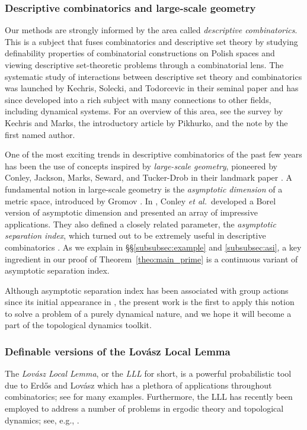 \documentclass[11pt,reqno,psamsfonts]{amsart}
\theoremstyle{bfnote}
\theoremstyle{definition}
\theoremstyle{remark}
\newcommand{\0}{\varnothing}
\numberwithin{equation}{section}
\begin{document}
    \subsubsection*{Descriptive combinatorics and large-scale geometry} Our methods are strongly informed by the area called \emph{descriptive combinatorics}. This is a subject that fuses combinatorics and descriptive set theory by studying definability properties of combinatorial constructions on Polish spaces and viewing descriptive set-theoretic problems through a combinatorial lens. The systematic study of interactions between descriptive set theory and combinatorics was launched by Kechris, Solecki, and Todorcevic in their seminal paper \cite{KST} and has since developed into a rich subject with many connections to other fields, including dynamical systems. For an overview of this area, see the survey \cite{KechrisMarks} by Kechris and Marks, the introductory article \cite{Pikh_survey} by Pikhurko, and %
    the note \cite{Notices} by the first named author. %

    One of the most exciting trends in descriptive combinatorics of the past few years has been the use of concepts inspired by \emph{large-scale geometry}, pioneered by Conley, Jackson, Marks, Seward, and Tucker-Drob in their landmark paper \cite{CJMSTD}. A fundamental notion in large-scale geometry is the \emph{asymptotic dimension} of a metric space, introduced by Gromov \cite[\S1.E]{gromov1993asymptotic}. In \cite{CJMSTD}, Conley \emph{et al.}~developed a {Borel} version of asymptotic dimension and presented an array of impressive applications. They also defined a closely related parameter, the \emph{asymptotic separation index}, which turned out to be extremely useful in descriptive combinatorics \cite{ASIalgorithms,BW,BWKonig,CJMSTD,WeilacherFinDim,Grids2}. As we explain in \S\S\ref{subsubsec:example} and \ref{subsubsec:asi}, a key ingredient in our proof of Theorem~\ref{theo:main_prime} is a {continuous} variant of asymptotic separation index.
    
    Although asymptotic separation index has been associated with group actions since its initial appearance in \cite{CJMSTD}, the present work is the first to apply this notion to solve a problem of a purely dynamical nature, and we hope it will become a part of the topological dynamics toolkit.

    \subsubsection*{Definable versions of the Lov\'asz Local Lemma} The \emph{Lov\'asz Local Lemma}, or the \emph{LLL} for short, is a powerful probabilistic tool due to Erd\H{o}s and Lov\'asz \cite{EL} which has a plethora of applications throughout combinatorics; see \cite{AS,MolloyReed} for many examples. Furthermore, the LLL has recently been employed to address a number of problems in ergodic theory and topological dynamics; see, e.g., \cite{ABT,Elek,Ber_cont,LLLDyn1,LLLDyn2,LLLDyn3,LLLDyn4}. %
    
\end{document}

